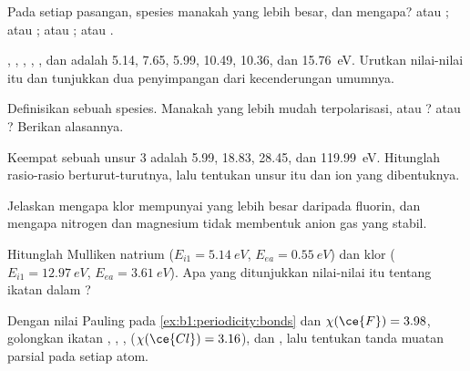\begin{exercise}[$\star$]\label{exo:b1:periodicity:2}
Pada setiap pasangan, spesies manakah yang lebih besar, dan mengapa?
 atau ;  atau ;  atau ;
 atau .
\end{exercise}

\begin{exercise}[$\star$]\label{exo:b1:periodicity:3}
 , , , , , dan
 adalah 5.14, 7.65, 5.99, 10.49, 10.36, dan \qty{15.76}{eV}.
Urutkan nilai-nilai itu dan tunjukkan dua penyimpangan dari kecenderungan
umumnya.
\end{exercise}

\begin{exercise}[$\star$]\label{exo:b1:periodicity:4}
Definisikan  sebuah spesies. Manakah yang lebih mudah
terpolarisasi,  atau ?  atau ? Berikan
alasannya.
\end{exercise}

\begin{exercise}[$\star\star$]\label{exo:b1:periodicity:5}
Keempat  sebuah unsur  3 adalah 5.99,
18.83, 28.45, dan \qty{119.99}{eV}. Hitunglah rasio-rasio berturut-turutnya,
lalu tentukan unsur itu dan ion yang dibentuknya.
\end{exercise}

\begin{exercise}[$\star\star$]\label{exo:b1:periodicity:6}
Jelaskan mengapa klor mempunyai  yang lebih besar
daripada fluorin, dan mengapa nitrogen dan magnesium tidak membentuk anion
gas yang stabil.
\end{exercise}

\begin{exercise}[$\star\star$]\label{exo:b1:periodicity:7}
Hitunglah  Mulliken natrium ($E_{i1} =
\qty{5.14}{eV}$, $E_{ea} = \qty{0.55}{eV}$) dan klor ($E_{i1} =
\qty{12.97}{eV}$, $E_{ea} = \qty{3.61}{eV}$). Apa yang ditunjukkan
nilai-nilai itu tentang ikatan dalam ?
\end{exercise}

\begin{exercise}[$\star\star$]\label{exo:b1:periodicity:8}
Dengan nilai Pauling pada \cref{ex:b1:periodicity:bonds} dan $\chi(\ce{F})
= 3.98$, golongkan ikatan , , , 
($\chi(\ce{Cl}) = 3.16$), dan , lalu tentukan tanda muatan parsial
pada setiap atom.
\end{exercise}

